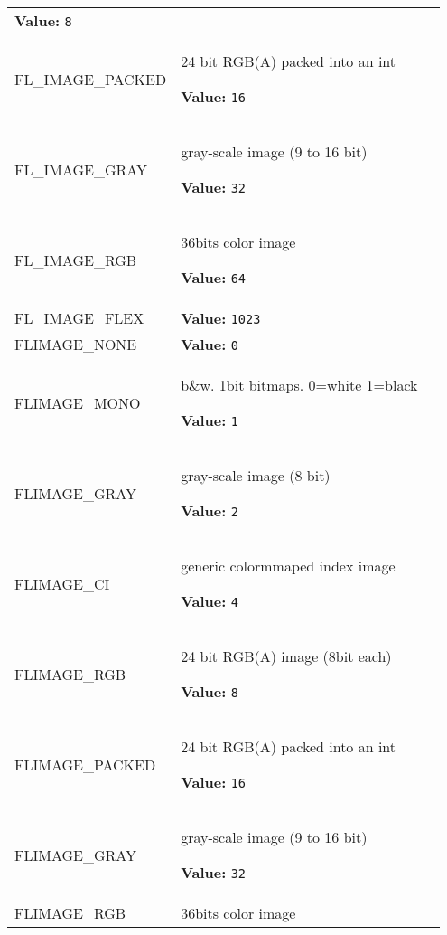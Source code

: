 \begin{longtable}{|p{\varnamewidth}|p{\vardescrwidth}|l}
\textbf{Value:} 
{\tt 8}&\\
\cline{1-2}
\raggedright F\-L\-\_\-I\-M\-A\-G\-E\-\_\-P\-A\-C\-K\-E\-D\- & \raggedright 24 bit RGB(A) packed into an int

\textbf{Value:} 
{\tt 16}&\\
\cline{1-2}
\raggedright F\-L\-\_\-I\-M\-A\-G\-E\-\_\-G\-R\-A\-Y\-1\-6\- & \raggedright gray-scale image (9 to 16 bit)

\textbf{Value:} 
{\tt 32}&\\
\cline{1-2}
\raggedright F\-L\-\_\-I\-M\-A\-G\-E\-\_\-R\-G\-B\-1\-6\- & \raggedright 36bits color image

\textbf{Value:} 
{\tt 64}&\\
\cline{1-2}
\raggedright F\-L\-\_\-I\-M\-A\-G\-E\-\_\-F\-L\-E\-X\- & \raggedright \textbf{Value:} 
{\tt 1023}&\\
\cline{1-2}
\raggedright F\-L\-I\-M\-A\-G\-E\-\_\-N\-O\-N\-E\- & \raggedright \textbf{Value:} 
{\tt 0}&\\
\cline{1-2}
\raggedright F\-L\-I\-M\-A\-G\-E\-\_\-M\-O\-N\-O\- & \raggedright b\&w. 1bit bitmaps. 0=white 1=black

\textbf{Value:} 
{\tt 1}&\\
\cline{1-2}
\raggedright F\-L\-I\-M\-A\-G\-E\-\_\-G\-R\-A\-Y\- & \raggedright gray-scale image (8 bit)

\textbf{Value:} 
{\tt 2}&\\
\cline{1-2}
\raggedright F\-L\-I\-M\-A\-G\-E\-\_\-C\-I\- & \raggedright generic colormmaped index image

\textbf{Value:} 
{\tt 4}&\\
\cline{1-2}
\raggedright F\-L\-I\-M\-A\-G\-E\-\_\-R\-G\-B\- & \raggedright 24 bit RGB(A) image (8bit each)

\textbf{Value:} 
{\tt 8}&\\
\cline{1-2}
\raggedright F\-L\-I\-M\-A\-G\-E\-\_\-P\-A\-C\-K\-E\-D\- & \raggedright 24 bit RGB(A) packed into an int

\textbf{Value:} 
{\tt 16}&\\
\cline{1-2}
\raggedright F\-L\-I\-M\-A\-G\-E\-\_\-G\-R\-A\-Y\-1\-6\- & \raggedright gray-scale image (9 to 16 bit)

\textbf{Value:} 
{\tt 32}&\\
\cline{1-2}
\raggedright F\-L\-I\-M\-A\-G\-E\-\_\-R\-G\-B\-1\-6\- & \raggedright 36bits color image


\end{longtable}
